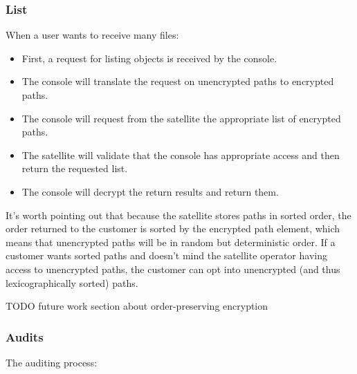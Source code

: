 \documentclass[a4paper,10pt]{article} \usepackage[utf8]{inputenc}
\newcommand{\todo}[1]{{\color{red} TODO #1 }}
\begin{document}
\subsubsection{List}

When a user wants to receive many files:

\begin{itemize}
\item First, a request for listing objects is received by the console.
\item The console will translate the request on unencrypted paths to encrypted
  paths.
\item The console will request from the satellite the appropriate list of
  encrypted paths.
\item The satellite will validate that the console has appropriate access
  and then return the requested list.
\item The console will decrypt the return results and return them.
\end{itemize}

It's worth pointing out that because the satellite stores paths in sorted
order, the order returned to the customer is sorted by the encrypted
path element, which means that unencrypted paths will be in random but
deterministic order. If a customer wants sorted paths and doesn't mind the
satellite operator having access to unencrypted paths, the customer can opt
into unencrypted (and thus lexicographically sorted) paths.

\todo{future work section about order-preserving encryption}

\subsubsection{Audits}

The auditing process:
\end{document}
